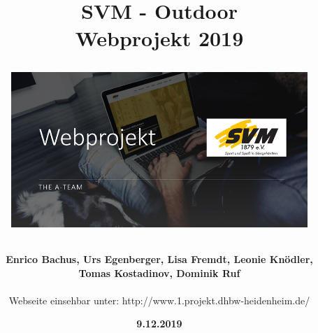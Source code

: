 \documentclass[12pt,a4paper]{article}
\begin{document}
\begin{titlepage}
\title{\vspace*{1cm} \huge{\textbf{SVM - Outdoor}} \\ \textbf{Webprojekt 2019}\\
\vspace*{2cm}
\begin{figure}[htb]
\advance\leftskip-2cm
\includegraphics[scale=1.2]{Startseite.png}
\end{figure}
\vspace{2cm}}
\author{\textbf{Enrico Bachus, Urs Egenberger, Lisa Fremdt, Leonie Knödler,}\\ \textbf{Tomas Kostadinov, Dominik Ruf}\\
\vspace*{5mm}\\
Webseite einsehbar unter: http://www.1.projekt.dhbw-heidenheim.de/}
\date{\vspace{1cm} \textbf{9.12.2019}}

\end{titlepage}
\maketitle
\newpage
\tableofcontents
\newpage
\end{document}
